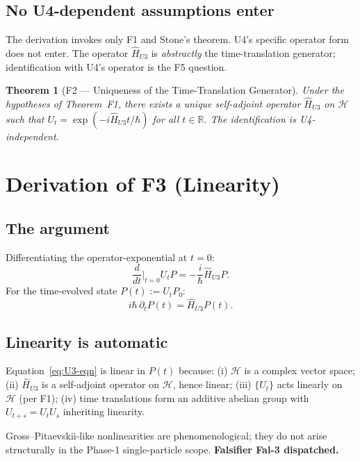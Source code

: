 \documentclass[11pt,a4paper]{article}
\newtheorem{theorem}{Theorem}[section]
\begin{document}
\subsection{No U4-dependent assumptions enter}

The derivation invokes only F1 and Stone's theorem. U4's specific operator form does not enter. The operator $\hat{H}_{U3}$ is \emph{abstractly} the time-translation generator; identification with U4's operator is the F5 question.

\begin{theorem}[F2 --- Uniqueness of the Time-Translation Generator]
Under the hypotheses of Theorem~F1, there exists a unique self-adjoint operator $\hat{H}_{U3}$ on $\mathcal{H}$ such that $U_t = \exp(-i\hat{H}_{U3} t/\hbar)$ for all $t \in \mathbb{R}$. The identification is U4-independent.
\end{theorem}

\section{Derivation of F3 (Linearity)}\label{sec:F3}

\subsection{The argument}

Differentiating the operator-exponential at $t = 0$:
\[
\frac{d}{dt}\bigg|_{t=0} U_t P = -\frac{i}{\hbar} \hat{H}_{U3} P.
\]
For the time-evolved state $P(t) := U_t P_0$:
\begin{equation}
i\hbar \, \partial_t P(t) = \hat{H}_{U3} P(t). \label{eq:U3-eqn}
\end{equation}

\subsection{Linearity is automatic}

Equation~\eqref{eq:U3-eqn} is linear in $P(t)$ because: (i) $\mathcal{H}$ is a complex vector space; (ii) $\hat{H}_{U3}$ is a self-adjoint operator on $\mathcal{H}$, hence linear; (iii) $\{U_t\}$ acts linearly on $\mathcal{H}$ (per F1); (iv) time translations form an additive abelian group with $U_{t+s} = U_t U_s$ inheriting linearity.

Gross--Pitaevskii-like nonlinearities are phenomenological; they do not arise structurally in the Phase-1 single-particle scope. \textbf{Falsifier Fal-3 dispatched.}
\end{document}
